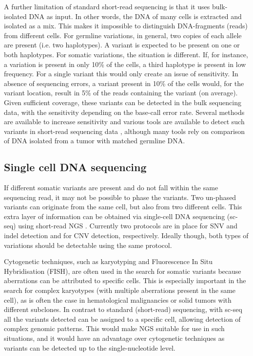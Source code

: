 A further limitation of standard short-read sequencing is that it uses bulk-isolated DNA as input. 
In other words, the DNA of many cells is extracted and isolated as a mix. 
This makes it impossible to distinguish DNA-fragments (reads) from different cells. 
For germline variations, in general, two copies of each allele are present (i.e. two haplotypes). 
A variant is expected to be present on one or both haplotypes. For somatic variations, the situation is different. 
If, for instance, a variation is present in only 10\% of the cells, a third haplotype is present in low frequency. 
For a single variant this would only create an issue of sensitivity. 
In absence of sequencing errors, a variant present in 10\% of the cells would, for the variant location, result in 5\% of the reads containing the variant (on average). 
Given sufficient coverage, these variants can be detected in the bulk sequencing data, with the sensitivity depending on the base-call error rate. 
Several methods are available to increase sensitivity \cite{Hiatt_2013,Stahlberg_2017} and various tools are available to detect such variants in short-read sequencing data \cite{Wilm_2012,Huang_2017,Said_Mohammed_2018}, although many tools rely on comparison of DNA isolated from a tumor with matched germline DNA. 

\subsection{Single cell DNA sequencing}
If different somatic variants are present and do not fall within the same sequencing read, it may not be possible to phase the variants. 
Two un-phased variants can originate from the same cell, but also from two different cells. 
This extra layer of information can be obtained via single-cell DNA sequencing (sc-seq) using short-read NGS \cite{van_den_Bos_2018, Price_2018}. 
Currently two protocols are in place for SNV and indel detection and for CNV detection, respectively. 
Ideally though, both types of variations should be detectable using the same protocol.

Cytogenetic techniques, such as karyotyping and Fluorescence In Situ Hybridisation (FISH), are often used in the search for somatic variants because aberrations can be attributed to specific cells. 
This is especially important in the search for complex karyotypes (with multiple aberrations present in the same cell), as is often the case in hematological malignancies or solid tumors with different subclones. 
In contrast to standard (short-read) sequencing, with sc-seq all the variants detected can be assigned to a specific cell, allowing detection of complex genomic patterns. 
This would make NGS suitable for use in such situations, and it would have an advantage over cytogenetic techniques as variants can be detected up to the single-nucleotide level.

